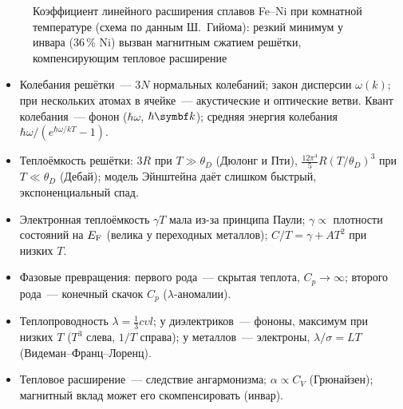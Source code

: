\begin{figure}[ht]
\centering
{}
\caption{Коэффициент линейного расширения сплавов Fe--Ni при комнатной
температуре (схема по данным Ш.~Гийома): резкий минимум у инвара
(36\,\% Ni) вызван магнитным сжатием решётки, компенсирующим тепловое
расширение}
\label{fig:invar}
\end{figure}

\begin{itogi}
\begin{itemize}
\item Колебания решётки~— $3N$ нормальных колебаний; закон дисперсии
$\omega(k)$; при нескольких атомах в ячейке~— акустические и оптические
ветви. Квант колебания~— фонон ($\hbar\omega$, $\hbar\vb k$); средняя энергия
колебания $\hbar\omega/(e^{\hbar\omega/kT}-1)$.
\item Теплоёмкость решётки: $3R$ при $T\gg\theta_D$ (Дюлонг и Пти),
$\frac{12\pi^4}5R(T/\theta_D)^3$ при $T\ll\theta_D$ (Дебай); модель Эйнштейна
даёт слишком быстрый, экспоненциальный спад.
\item Электронная теплоёмкость $\gamma T$ мала из-за принципа Паули;
$\gamma\propto$ плотности состояний на $E_{\mathrm{F}}$ (велика у переходных металлов);
$C/T=\gamma+AT^2$ при низких $T$.
\item Фазовые превращения: первого рода~— скрытая теплота, $C_p\to\infty$;
второго рода~— конечный скачок $C_p$ ($\lambda$-аномалии).
\item Теплопроводность $\lambda=\frac13c\upsilon l$; у диэлектриков~— фононы,
максимум при низких $T$ ($T^3$ слева, $1/T$ справа); у металлов~—
электроны, $\lambda/\sigma=LT$ (Видеман--Франц--Лоренц).
\item Тепловое расширение~— следствие ангармонизма; $\alpha\propto C_V$
(Грюнайзен); магнитный вклад может его скомпенсировать (инвар).
\end{itemize}
\end{itogi}

